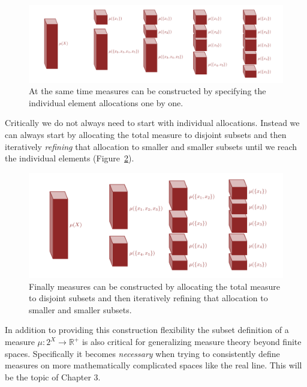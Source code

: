 \documentclass[
  letterpaper,
  DIV=11,
  numbers=noendperiod]{scrartcl}
\begin{document}
\begin{figure}

{\centering \includegraphics[width=1\textwidth,height=\textheight]{figures/decompositions/one_at_a_time/one_at_a_time.pdf}

}

\caption{\label{fig-one_at_a_time}At the same time measures can be
constructed by specifying the individual element allocations one by
one.}

\end{figure}

Critically we do not always need to start with individual allocations.
Instead we can always start by allocating the total measure to disjoint
subsets and then iteratively \emph{refining} that allocation to smaller
and smaller subsets until we reach the individual elements
(Figure~\ref{fig-refinement}).

\begin{figure}

{\centering \includegraphics[width=1\textwidth,height=\textheight]{figures/decompositions/refinement/refinement.pdf}

}

\caption{\label{fig-refinement}Finally measures can be constructed by
allocating the total measure to disjoint subsets and then iteratively
refining that allocation to smaller and smaller subsets.}

\end{figure}

In addition to providing this construction flexibility the subset
definition of a measure \(\mu : 2^{X} \rightarrow \mathbb{R}^{+}\) is
also critical for generalizing measure theory beyond finite spaces.
Specifically it becomes \emph{necessary} when trying to consistently
define measures on more mathematically complicated spaces like the real
line. This will be the topic of Chapter 3.
\end{document}
